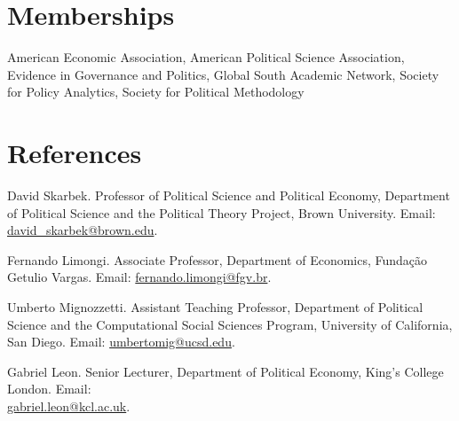 \documentclass[a4paper]{article}
\renewenvironment{itemize}{
	\begin{list}{}{
			\setlength{\leftmargin}{1.5em}
		}
		}{
	\end{list}
}
\begin{document}
\section*{Memberships}

\begin{itemize}
\item American Economic Association, American Political Science Association, Evidence in Governance and Politics, Global South Academic Network, Society for Policy Analytics, Society for Political Methodology
\end{itemize}

\section*{References}

\begin{itemize}

\item David Skarbek. Professor of Political Science and Political Economy, Department of Political Science and the Political Theory Project, Brown University. Email: \href{mailto:davidskarbek@gmail.com}{david\_skarbek@brown.edu}.
\item Fernando Limongi. Associate Professor, Department of Economics, Fundação Getulio Vargas. Email: \href{mailto:fernando.limongi@fgv.br}{fernando.limongi@fgv.br}.
\item Umberto Mignozzetti. Assistant Teaching Professor, Department of Political Science and the Computational Social Sciences Program, University of California, San Diego. Email: \href{mailto:umbertomig@ucsd.edu}{umbertomig@ucsd.edu}.
\item Gabriel Leon. Senior Lecturer, Department of Political Economy, King's College London. Email: \\ \href{mailto:gabriel.leon@kcl.ac.uk}{gabriel.leon@kcl.ac.uk}.
\end{itemize}

	\bigskip
\end{document}
